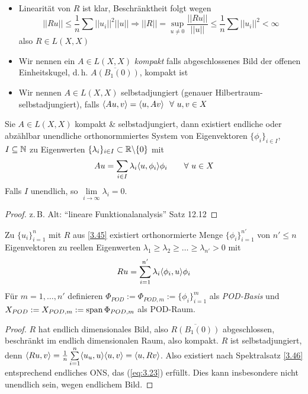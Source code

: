 \begin{bem} \beginwithlistbem
	\begin{itemize}
		\item Linearität von $R$ ist klar, Beschränktheit folgt wegen
		\[
			||Ru|| \leq \frac{1}{n} \sum ||u_i||^2 ||u|| \Rightarrow ||R|| = \sup_{u \neq 0} \frac{||Ru||}{||u||} \leq \frac{1}{n} \sum ||u_i||^2 < \infty
		\]
		also $R \in L(X,X)$
		\item Wir nennen ein $A \in L(X,X)$ \emph{kompakt} falls abgeschlossenes Bild der offenen Einheitskugel, d.\,h. $\overline{A(B_1(0))}$, kompakt ist
		\item Wir nennen $A \in L(X,X)$ selbstadjungiert (genauer Hilbertraum-selbstadjungiert), falls $\langle Au, v \rangle = \langle u, Av \rangle \,\,\,\, \forall \,\, u,v \in X$
	\end{itemize}
\end{bem}

\begin{satz}[Spektralsatz]
\label{3.46}
Sie $A \in L(X,X)$ kompakt \& selbstadjungiert, dann existiert endliche oder abzählbar unendliche orthonormmiertes System von Eigenvektoren $\{\phi_i\}_{i \in I}$, $I \subseteq \mathbb{N}$ zu Eigenwerten $\{\lambda_i\}_{i \in I} \subset \mathbb{R} \backslash \{0\}$ mit
\[
	Au = \sum_{i \in I} \lambda_i \dotp{u}{\phi_i} \phi_i \qquad \forall \,\, u \in X
\]
Falls $I$ unendlich, so $\lim\limits_{i \rightarrow \infty} \lambda_i = 0$.
\begin{proof}
	z.\,B. Alt: ``lineare Funktionalanalysis'' Satz 12.12
\end{proof}
\end{satz}

\begin{satz}
Zu $\{u_i\}_{i=1}^n$ mit $R$ aus \ref{3.45} existiert orthonormierte Menge $\{\phi_i\}_{i=1}^{n'}$ von $n' \leq n$ Eigenvektoren zu reellen Eigenwerten $\lambda_1 \geq \lambda_2 \geq \dots \geq \lambda_{n'} > 0$ mit
\begin{align}
	Ru = \sum\limits_{i=1}^{n'} \lambda_i \dotp{\phi_i}{u} \phi_i
	\label{eq:3.23}
\end{align}
Für $m = 1,\dots,n'$ definieren $\Phi_{POD} := \Phi_{POD,m} := \{\phi_i\}_{i=1}^m$ als \emph{POD-Basis} und $X_{POD} := X_{POD,m} := \operatorname{span} \Phi_{POD,m}$ als POD-Raum.
\begin{proof}
	$R$ hat endlich dimensionales Bild, also $\overline{R(B_1(0))}$ abgeschlossen, beschränkt im endlich dimensionalen Raum, also kompakt. $R$ ist selbstadjungiert, denn $\langle Ru, v \rangle = \frac{1}{n} \sum\limits_{i=1}^n \langle u_u, u \rangle \langle u, v \rangle = \langle u, Rv \rangle$. Also existiert nach Spektralsatz \ref{3.46} entsprechend endliches ONS, das (\ref{eq:3.23}) erfüllt. Dies kann insbesondere nicht unendlich sein, wegen endlichem Bild.
\end{proof}
\end{satz}

